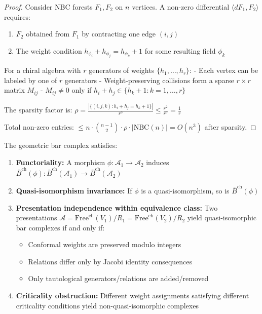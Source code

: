\begin{proof}
Consider NBC forests $F_1, F_2$ on $n$ vertices. A non-zero differential $\langle dF_1, F_2 \rangle$ requires:
\begin{enumerate}
\item $F_2$ obtained from $F_1$ by contracting one edge $(i,j)$
\item The weight condition $h_{\phi_i} + h_{\phi_j} = h_{\phi_k} + 1$ for some resulting field $\phi_k$
\end{enumerate}

For a chiral algebra with $r$ generators of weights $\{h_1, \ldots, h_r\}$:
- Each vertex can be labeled by one of $r$ generators
- Weight-preserving collisions form a sparse $r \times r$ matrix $M_{ij}$
- $M_{ij} \neq 0$ only if $h_i + h_j \in \{h_k + 1 : k = 1, \ldots, r\}$

The sparsity factor is:
$\rho = \frac{|\{(i,j,k) : h_i + h_j = h_k + 1\}|}{r^3} \leq \frac{r^2}{r^3} = \frac{1}{r}$

Total non-zero entries: $\leq n \cdot \binom{n-1}{2} \cdot \rho \cdot |\text{NBC}(n)| = O(n^3)$ after sparsity.
\end{proof}

\begin{theorem}\label{thm:presentation-independence}
   The geometric bar complex satisfies:
   \begin{enumerate}
   \item \textbf{Functoriality:} A morphism $\phi: \mathcal{A}_1 \to \mathcal{A}_2$ induces 
   $\bar{B}^{\text{ch}}(\phi): \bar{B}^{\text{ch}}(\mathcal{A}_1) \to \bar{B}^{\text{ch}}(\mathcal{A}_2)$
   
   \item \textbf{Quasi-isomorphism invariance:} If $\phi$ is a quasi-isomorphism, so is $\bar{B}^{\text{ch}}(\phi)$
   
   \item \textbf{Presentation independence within equivalence class:} Two presentations 
   $\mathcal{A} = \text{Free}^{\text{ch}}(V_1)/R_1 = \text{Free}^{\text{ch}}(V_2)/R_2$ 
   yield quasi-isomorphic bar complexes if and only if:
      \begin{itemize}
      \item Conformal weights are preserved modulo integers
      \item Relations differ only by Jacobi identity consequences
      \item Only tautological generators/relations are added/removed
      \end{itemize}
      
   \item \textbf{Criticality obstruction:} Different weight assignments satisfying different criticality 
   conditions yield non-quasi-isomorphic complexes
   \end{enumerate}
   \end{theorem}
   
